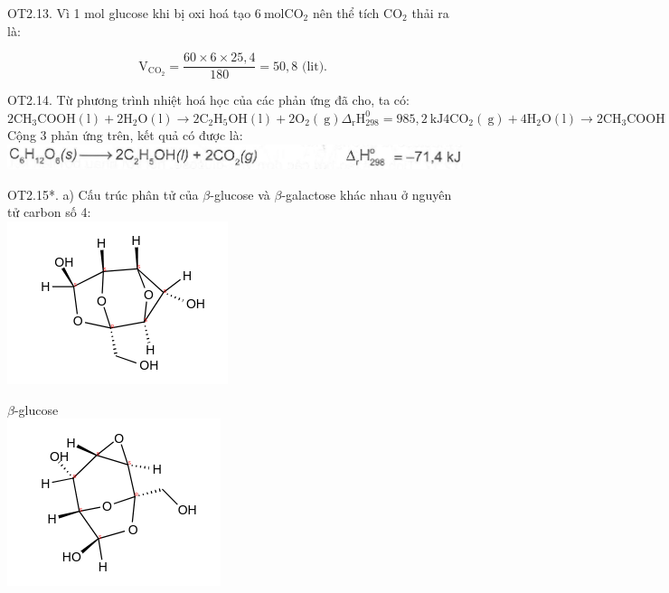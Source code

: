 \documentclass[10pt]{article}
\begin{document}
OT2.13. Vì 1 mol glucose khi bị oxi hoá tạo $6 \mathrm{~mol} \mathrm{CO}_{2}$ nên thể tích $\mathrm{CO}_{2}$ thải ra là:

$$
\mathrm{V}_{\mathrm{CO}_{2}}=\frac{60 \times 6 \times 25,4}{180}=50,8 \text { (lit). }
$$

OT2.14. Từ phương trình nhiệt hoá học của các phản ứng đã cho, ta có: $2 \mathrm{CH}_{3} \mathrm{COOH}(\mathrm{l})+2 \mathrm{H}_{2} \mathrm{O}(\mathrm{l}) \longrightarrow 2 \mathrm{C}_{2} \mathrm{H}_{5} \mathrm{OH}(\mathrm{l})+2 \mathrm{O}_{2}(\mathrm{~g}) \Delta_{\mathrm{r}} \mathrm{H}_{298}^{0}=985,2 \mathrm{~kJ} 4 \mathrm{CO}_{2}(\mathrm{~g})+4 \mathrm{H}_{2} \mathrm{O}(\mathrm{l}) \longrightarrow 2 \mathrm{CH}_{3} \mathrm{COOH}(\mathrm{l})+4 \mathrm{O}_{2}(\mathrm{~g}) \quad \Delta_{\mathrm{r}} \mathrm{H}_{298}^{\circ}=1748,4 \mathrm{~kJ} \mathrm{C}_{6} \mathrm{H}_{12} \mathrm{O}_{6}(\mathrm{~s})+6 \mathrm{O}_{2}(\mathrm{~g}) \longrightarrow 6 \mathrm{CO}_{2}(\mathrm{~g})+6 \mathrm{H}_{2} \mathrm{O}(\mathrm{l}) \quad \Delta_{\mathrm{r}} \mathrm{H}_{298}^{\circ}=-2805,0 \mathrm{~kJ}$\\
Cộng 3 phản ứng trên, kết quả có được là:\\
\includegraphics[max width=\textwidth, center]{2025_10_23_b4e16b74380d0f7e7700g-040}

OT2.15*. a) Cấu trúc phân tử của $\beta$-glucose và $\beta$-galactose khác nhau ở nguyên tử carbon số 4:\\
\includegraphics{smile-6278cdebffc6783a5af43cbb1f475e2092f311a7}

$\beta$-glucose\\
\includegraphics{smile-867b903398adadf86290bd19be4fd81a169aed99}
\end{document}
